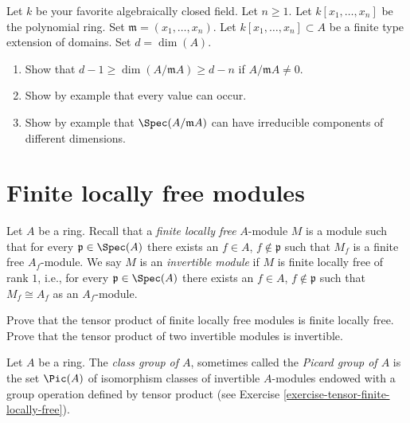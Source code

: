 \begin{exercise}
\label{exercise-codim-1}
Let $k$ be your favorite algebraically closed field.
Let $n \geq 1$.
Let $k[x_1, \ldots, x_n]$ be the polynomial ring.
Set $\mathfrak m = (x_1, \ldots, x_n)$.
Let $k[x_1, \ldots, x_n] \subset A$ be a finite type extension of
domains. Set $d = \dim(A)$.
\begin{enumerate}
\item Show that $d - 1 \geq \dim(A/\mathfrak m A) \geq d - n$
if $A/\mathfrak mA \not = 0$.
\item Show by example that every value can occur.
\item Show by example that $\Spec(A/\mathfrak m A)$ can
have irreducible components of different dimensions.
\end{enumerate}
\end{exercise}




\section{Finite locally free modules}
\label{section-finite-locally-free}

\begin{definition}
\label{definition-finite-locally-free}
Let $A$ be a ring. Recall that a {\it finite locally free} $A$-module
$M$ is a module such that for every ${\mathfrak p} \in \Spec(A)$
there exists an
$f\in A$, $f \not \in {\mathfrak p}$ such that $M_f$ is a finite free
$A_f$-module. We say $M$ is an {\it invertible module} if
$M$ is finite locally free of rank $1$, i.e., for every
${\mathfrak p} \in \Spec(A)$ there exists an
$f\in A$, $f \not \in \mathfrak p$ such that $M_f \cong A_f$
as an $A_f$-module.
\end{definition}

\begin{exercise}
\label{exercise-tensor-finite-locally-free}
Prove that the tensor product of finite locally free modules
is finite locally free. Prove that the tensor product of two
invertible modules is invertible.
\end{exercise}

\begin{definition}
\label{definition-class-group}
Let $A$ be a ring. The {\it class group of $A$}, sometimes called
the {\it Picard group of $A$} is the set $\Pic(A)$
of isomorphism classes of invertible $A$-modules endowed with
a group operation defined by tensor product (see
Exercise \ref{exercise-tensor-finite-locally-free}).
\end{definition}

